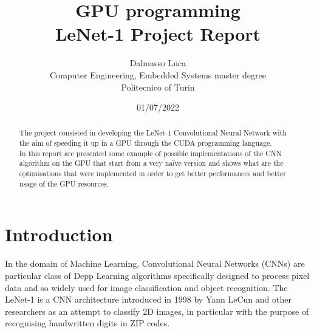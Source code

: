 \documentclass[a4paper]{report}
\begin{document}
\title{GPU programming \\ LeNet-1 Project Report}
\author{Dalmasso Luca\\
        Computer Engineering, Embedded Systems master degree\\
        Politecnico of Turin
        }

\date{01/07/2022}

\maketitle
\tableofcontents
\listoffigures
\listoftables


\begin{abstract}
The project consisted in developing the LeNet-1 Convolutional Neural Network with the aim of speeding it up in a GPU through the CUDA programming language.\\
In this report are presented some example of possible implementations of the CNN algorithm on the GPU that start from a very naïve version and shows what are the optimisations that were implemented in order to get better performances and better usage of the GPU resources.

\end{abstract}

\section{Introduction}
In the domain of Machine Learning, Convolutional Neural Networks (CNNs) are particular class of  Depp Learning algorithms specifically designed to process pixel data and so  widely used for image classification and object recognition.
The LeNet-1 is a CNN architecture introduced in 1998 by Yann LeCun and other researchers as an attempt to classify 2D images, in particular with the purpose of recognising handwritten digits in ZIP codes.

\end{document}
